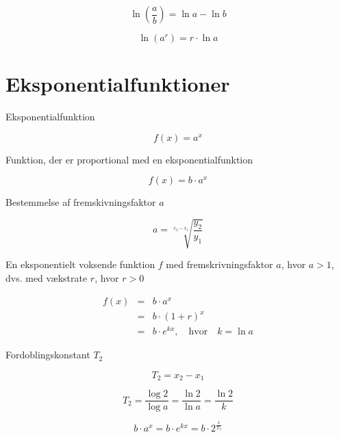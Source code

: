 \documentclass[11pt,a4paper,landscape,twocolumn,fleqn,leqno]{article}
\begin{document}
\begin{equation}
\ln\left(\frac{a}{b}\right) = \ln a - \ln b
\end{equation}

\begin{equation}
\ln(a^r) = r \cdot \ln a
\end{equation}

\vfill

\section{Eksponentialfunktioner}

Eksponentialfunktion

\begin{equation}
f(x) = a^x
\end{equation}

Funktion, der er proportional med en eksponentialfunktion

\begin{equation}
f(x) = b \cdot a^x
\end{equation}

Bestemmelse af fremskivningsfaktor $a$

\begin{equation}
a = \sqrt[x_2-x_1]{\frac{y_2}{y_1}}
\end{equation}

En eksponentielt voksende funktion $f$ med fremskrivningsfaktor $a$, hvor $a > 1$, dvs. med vækstrate $r$, hvor $r > 0$

\begin{eqnarray}
f(x) & = & b \cdot a^x \\
 & = & b \cdot (1+r)^x \nonumber \\
 & = & b \cdot e^{kx}, \quad \text{hvor} \quad k = \ln a \nonumber
\end{eqnarray}

Fordoblingskonstant $T_2$

\begin{equation}
T_2 = x_2 - x_1
\end{equation}

\begin{equation}
T_2 = \frac{\log 2}{\log a} = \frac{\ln 2}{\ln a} = \frac{\ln 2}{k}
\end{equation}

\begin{equation}
b \cdot a^x = b \cdot e^{kx} = b \cdot 2^{\frac{x}{T_2}}
\end{equation}
\end{document}

